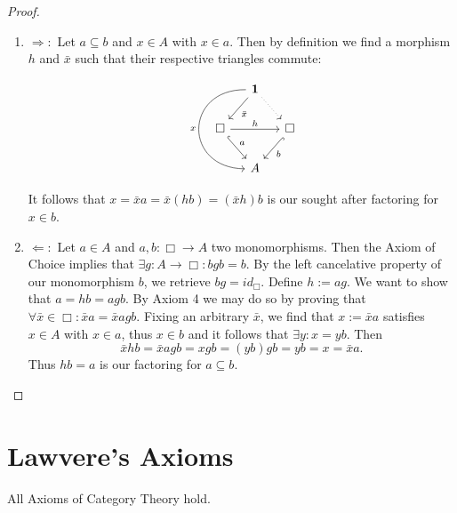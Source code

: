 \begin{proof}
\begin{enumerate} 
\item $\Rightarrow :$ Let $a \subseteq b$ and $x \in A$ with $x \in a$. Then by definition we find a morphism $h$ and $\bar{x}$ such that their respective triangles commute:

\begin{equation}
\begin{tikzcd}[column sep=small]
& \mathbf{1} \arrow[dl, "\bar{x}"] \arrow[dr, dotted] \arrow[dd, "x", bend right=90,looseness=2,swap]& \\
\Box \arrow[rr, "h"] \arrow[dr, "a", hook] &     & \Box \arrow[dl, "b", hook] \\
& A
\end{tikzcd}
\end{equation} \newline

It follows that $x = \bar{x}a = \bar{x}(hb) = (\bar{x}h)b$ is our sought after factoring for $x \in b$.

\item $\Leftarrow :$ Let $a \in A$ and $a,b: \Box \longrightarrow A$ two monomorphisms. Then the Axiom of Choice implies that $\exists g: A \longrightarrow \Box : bgb = b$. By the left cancelative property of our monomorphism $b$, we retrieve $bg = id_\Box$. Define $h := ag$. We want to show that $a = hb = agb$. By Axiom 4 we may do so by proving that $\forall \bar{x} \in \Box: \bar{x}a = \bar{x}agb$. Fixing an arbitrary $\bar{x}$, we find that $x := \bar{x}a$ satisfies $x \in A$ with $x \in a$, thus $x \in b$ and it follows that $\exists y : x = yb$. Then
\begin{equation*}
\bar{x}hb = \bar{x}agb = xgb = (yb)gb = yb = x = \bar{x}a.
\end{equation*}
Thus $hb = a$ is our factoring for $a \subseteq b$. 
\end{enumerate}
\end{proof}


\clearpage

\section{Lawvere's Axioms}

\setcounter{axiom}{0}

\begin{axiom}
All Axioms of Category Theory hold.
\end{axiom}

